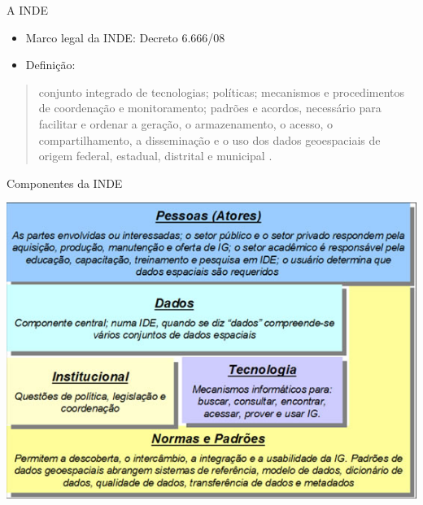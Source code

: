 \documentclass[9pt,ignorenonframetext,]{beamer}
\begin{document}
\begin{frame}{A INDE}
\protect\hypertarget{a-inde}{}

\begin{itemize}
\item
  Marco legal da INDE: Decreto 6.666/08
\item
  Definição:
\end{itemize}

\begin{quote}
conjunto integrado de tecnologias; políticas; mecanismos e procedimentos
de coordenação e monitoramento; padrões e acordos, necessário para
facilitar e ordenar a geração, o armazenamento, o acesso, o
compartilhamento, a disseminação e o uso dos dados geoespaciais de
origem federal, estadual, distrital e municipal \autocite{INDE}.
\end{quote}

\end{frame}

\begin{frame}{Componentes da INDE}
\protect\hypertarget{componentes-da-inde}{}

\begin{center}\includegraphics[width=0.7\linewidth]{images/Compenentes_INDE_2} \end{center}

\end{frame}
\end{document}
